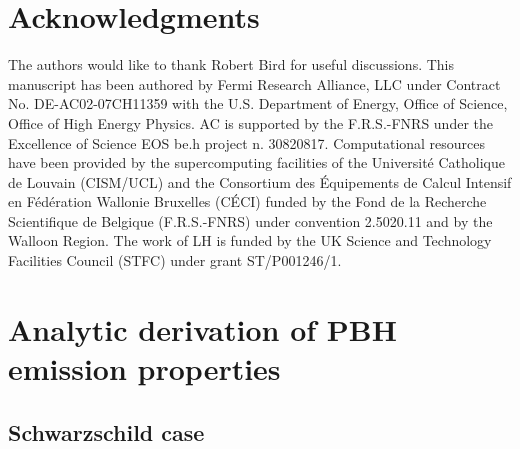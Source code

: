\documentclass[aps,prd,reprint,twocolumn,preprintnumbers,floatfix,nofootinbib]{revtex4-1}
\begin{document}
\appendix

\section*{Acknowledgments}
The authors would like to thank Robert Bird for useful discussions. This manuscript has been authored by Fermi Research Alliance, LLC under Contract No. DE-AC02-07CH11359 with the U.S. Department of Energy, Office of Science, Office of High Energy Physics. AC is supported by the F.R.S.-FNRS under the Excellence of Science EOS be.h project n. 30820817. Computational resources have been provided by the supercomputing facilities of the Université Catholique de Louvain (CISM/UCL) and the Consortium des Équipements de Calcul Intensif en Fédération Wallonie Bruxelles (CÉCI) funded by the Fond de la Recherche Scientifique de Belgique (F.R.S.-FNRS) under convention 2.5020.11 and by the Walloon Region. The work of LH is funded by the UK Science and Technology Facilities Council (STFC) under grant ST/P001246/1.

\section{Analytic derivation of PBH emission properties}\label{ap:A}


\subsection{Schwarzschild case}
\end{document}
